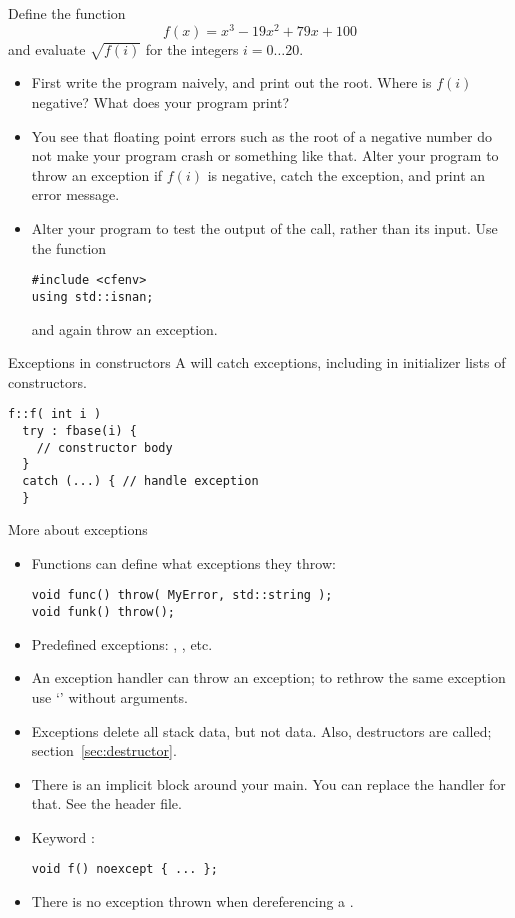 \begin{exercise}
  \label{ex:throw-negroot}
  Define the function \[ f(x)=x^3-19x^2+79x+100 \] and evaluate
  $\sqrt{f(i)}$ for the integers $i=0\ldots20$.
  \begin{itemize}
  \item First write the program naively, and print out the root. Where is
    $f(i)$ negative? What does your program print?
  \item You see that floating point errors such as the root of a negative number
    do not make your program crash or
    something like that. Alter your program to throw an exception if
    $f(i)$ is negative, catch the exception, and print an error
    message.
  \item Alter your program to test the output of the  call,
    rather than its input.
    Use the function 
\begin{lstlisting}
#include <cfenv>
using std::isnan;  
\end{lstlisting}
    and again throw an exception.
  \end{itemize}
\end{exercise}

\begin{block}{Exceptions in constructors}
  \label{sl:except-construct}
  A  will catch exceptions,
    including in initializer lists of constructors.
\begin{lstlisting}
f::f( int i ) 
  try : fbase(i) {
    // constructor body
  }
  catch (...) { // handle exception
  }
\end{lstlisting}
\end{block}

\begin{block}{More about exceptions}
  \label{sl:exception-more}
  \begin{itemize}
  \item Functions can define what exceptions they throw: 
\begin{lstlisting}
void func() throw( MyError, std::string );
void funk() throw();
\end{lstlisting}
\item Predefined exceptions: ,
  , etc.
\item An exception handler can throw an exception; to rethrow the same
  exception use `' without arguments.
\item Exceptions delete all stack data, but not  data. Also,
  destructors are called; section~\ref{sec:destructor}.
\item There is an implicit  block around your
  main. You can replace the handler for that. See the
   header file.
\item Keyword :
\begin{lstlisting}
void f() noexcept { ... };
\end{lstlisting}
\item There is no exception thrown when dereferencing a .
  \end{itemize}
\end{block}

